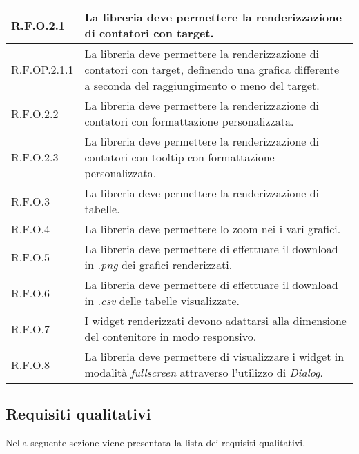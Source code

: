 \begin{center}
\begin{longtable}{|p{2.5cm}|p{10cm}|}
        \hline
        R.F.O.2.1          & La libreria deve permettere la renderizzazione di contatori con target.                                   \\
        \hline
        R.F.OP.2.1.1       & La libreria deve permettere la renderizzazione di contatori con target, definendo una grafica
        differente a seconda del raggiungimento o meno del target.                                                                     \\
        \hline
        R.F.O.2.2          & La libreria deve permettere la renderizzazione di contatori con formattazione personalizzata.             \\
        \hline
        R.F.O.2.3          & La libreria deve permettere la renderizzazione di contatori con tooltip con formattazione personalizzata. \\
        \hline
        R.F.O.3            & La libreria deve permettere la renderizzazione di tabelle.                                                \\
        \hline
        R.F.O.4            & La libreria deve permettere lo zoom nei i vari grafici.                                                   \\
        \hline
        R.F.O.5            & La libreria deve permettere di effettuare il download in \textit{.png} dei grafici renderizzati.          \\
        \hline
        R.F.O.6            & La libreria deve permettere di effettuare il download in \textit{.csv} delle tabelle visualizzate.        \\
        \hline
        R.F.O.7            & I widget renderizzati devono adattarsi alla dimensione del contenitore in modo responsivo.                \\
        \hline
        R.F.O.8            & La libreria deve permettere di visualizzare i widget in modalità \textit{fullscreen} attraverso
        l'utilizzo di \textit{Dialog}.                                                                                                 \\
    \end{longtable}
    \label{tab:requisiti_funzionali}
\end{center}

\subsection{Requisiti qualitativi}
Nella seguente sezione viene presentata la lista dei requisiti qualitativi.

